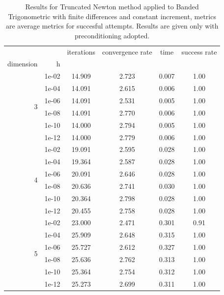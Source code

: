 \begin{table}
\centering
\caption{Results for Truncated Newton method applied to Banded Trigonometric with finite differences and constant increment, metrics are average metrics for succesful attempts. Results are given only with preconditioning adopted.}
\label{tab:Truncated_Newton_Banded_Trigonometric_fd_abs}
\begin{tabular}{rr|cccc}
\toprule
    &  & iterations & convergence rate & time & success rate \\
dimension & h &  &  &  &  \\
\midrule
\multirow[t]{6}{*}{3} & 1e-02 & 14.909 & 2.723 & 0.007 & 1.00 \\
    & 1e-04 & 14.091 & 2.615 & 0.006 & 1.00 \\
    & 1e-06 & 14.091 & 2.531 & 0.005 & 1.00 \\
    & 1e-08 & 14.091 & 2.770 & 0.006 & 1.00 \\
    & 1e-10 & 14.000 & 2.794 & 0.005 & 1.00 \\
    & 1e-12 & 14.000 & 2.779 & 0.006 & 1.00 \\
\cline{1-6}
\multirow[t]{6}{*}{4} & 1e-02 & 19.091 & 2.595 & 0.028 & 1.00 \\
    & 1e-04 & 19.364 & 2.587 & 0.028 & 1.00 \\
    & 1e-06 & 20.091 & 2.646 & 0.028 & 1.00 \\
    & 1e-08 & 20.636 & 2.741 & 0.030 & 1.00 \\
    & 1e-10 & 20.364 & 2.798 & 0.028 & 1.00 \\
    & 1e-12 & 20.455 & 2.758 & 0.028 & 1.00 \\
\cline{1-6}
\multirow[t]{6}{*}{5} & 1e-02 & 23.000 & 2.471 & 0.301 & 0.91 \\
    & 1e-04 & 25.909 & 2.648 & 0.315 & 1.00 \\
    & 1e-06 & 25.727 & 2.612 & 0.327 & 1.00 \\
    & 1e-08 & 25.636 & 2.762 & 0.313 & 1.00 \\
    & 1e-10 & 25.364 & 2.754 & 0.312 & 1.00 \\
    & 1e-12 & 25.273 & 2.699 & 0.311 & 1.00 \\
\cline{1-6}
\bottomrule
\end{tabular}
\end{table}

